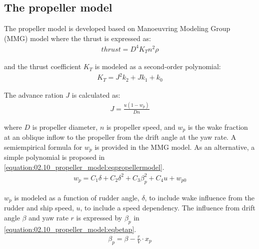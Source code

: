 \documentclass[review]{elsarticle}
\begin{document}
\subsection{The propeller model}
\label{\detokenize{02.10_propeller_model:propeller-model}}\label{\detokenize{02.10_propeller_model::doc}}
  
The propeller model is developed based on Manoeuvring Modeling Group (MMG) model \cite{yasukawa_introduction_2015-1} where the thrust is expressed as:
\begin{equation}\label{equation:02.10_propeller_model:eqT}
\begin{split}\displaystyle thrust = D^{4} K_{T} n^{2} \rho\end{split}
\end{equation}
  
and the thrust coefficient \(K_T\) is modeled as a second-order polynomial:
\begin{equation}\label{equation:02.10_propeller_model:eqkt}
\begin{split}\displaystyle K_{T} = J^{2} k_{2} + J k_{1} + k_{0}\end{split}
\end{equation}
  
The advance ration \(J\) is calculated as:
\begin{equation}\label{equation:02.10_propeller_model:eqJ}
\begin{split}\displaystyle J = \frac{u \left(1 - w_{p}\right)}{D n}\end{split}
\end{equation}
  
where \(D\) is propeller diameter, \(n\) is propeller speed, and \(w_p\) is the wake fraction at an oblique inflow to the propeller from the drift angle at the yaw rate. A semi\sphinxhyphen{}empirical formula for \(w_p\) is provided in the MMG model. As an alternative, a simple polynomial is proposed in \autoref{equation:02.10_propeller_model:eqpropellermodel}.
\begin{equation}\label{equation:02.10_propeller_model:eqpropellermodel}
\begin{split}\displaystyle w_{p} = C_{1} \delta + C_{2} \delta^{2} + C_{3} \beta_{p}^{2} + C_{4} u + w_{p0}\end{split}
\end{equation}
  
\(w_p\) is modeled as a function of rudder angle, \(\delta\), to include wake influence from the rudder and ship speed, \(u\), to include a speed dependency. The influence from drift angle \(\beta\) and yaw rate \(r\) is expressed by \(\beta_p\) in \autoref{equation:02.10_propeller_model:eqbetap}.
\begin{equation}\label{equation:02.10_propeller_model:eqbetap}
\begin{split}\beta_p=\beta - \frac{r}{V} \cdot x_p \end{split}
\end{equation}
  
\end{document}
